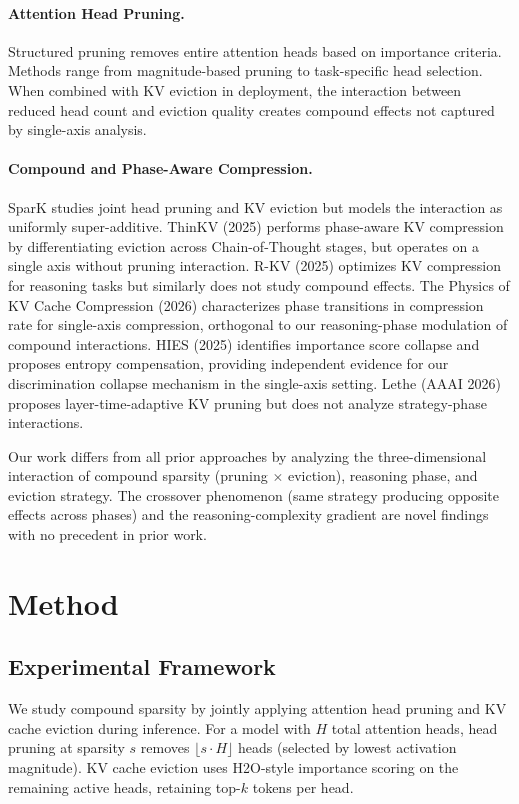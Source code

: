 \documentclass[11pt,a4paper]{article}
\begin{document}
\paragraph{Attention Head Pruning.}
Structured pruning removes entire attention heads based on importance criteria. Methods range from magnitude-based pruning to task-specific head selection. When combined with KV eviction in deployment, the interaction between reduced head count and eviction quality creates compound effects not captured by single-axis analysis.

\paragraph{Compound and Phase-Aware Compression.}
SparK studies joint head pruning and KV eviction but models the interaction as uniformly super-additive. ThinKV (2025) performs phase-aware KV compression by differentiating eviction across Chain-of-Thought stages, but operates on a single axis without pruning interaction. R-KV (2025) optimizes KV compression for reasoning tasks but similarly does not study compound effects. The Physics of KV Cache Compression (2026) characterizes phase transitions in compression rate for single-axis compression, orthogonal to our reasoning-phase modulation of compound interactions. HIES (2025) identifies importance score collapse and proposes entropy compensation, providing independent evidence for our discrimination collapse mechanism in the single-axis setting. Lethe (AAAI 2026) proposes layer-time-adaptive KV pruning but does not analyze strategy-phase interactions.

Our work differs from all prior approaches by analyzing the three-dimensional interaction of compound sparsity (pruning $\times$ eviction), reasoning phase, and eviction strategy. The crossover phenomenon (same strategy producing opposite effects across phases) and the reasoning-complexity gradient are novel findings with no precedent in prior work.

\section{Method}

\subsection{Experimental Framework}

We study compound sparsity by jointly applying attention head pruning and KV cache eviction during inference. For a model with $H$ total attention heads, head pruning at sparsity $s$ removes $\lfloor s \cdot H \rfloor$ heads (selected by lowest activation magnitude). KV cache eviction uses H2O-style importance scoring on the remaining active heads, retaining top-$k$ tokens per head.
\end{document}
